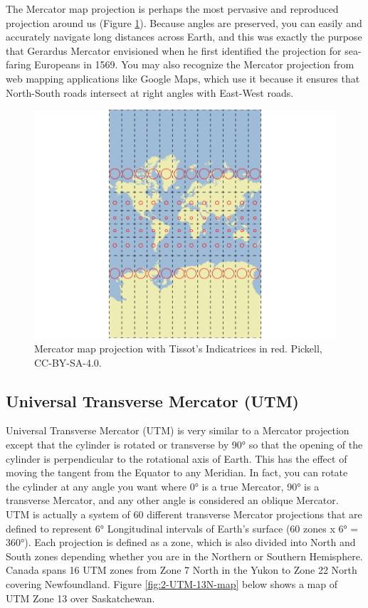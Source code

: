 \documentclass[
]{book}
\begin{document}
The Mercator map projection is perhaps the most pervasive and reproduced projection around us (Figure \ref{fig:2-Mercator-map}). Because angles are preserved, you can easily and accurately navigate long distances across Earth, and this was exactly the purpose that Gerardus Mercator envisioned when he first identified the projection for sea-faring Europeans in 1569. You may also recognize the Mercator projection from web mapping applications like Google Maps, which use it because it ensures that North-South roads intersect at right angles with East-West roads.

\begin{figure}
\includegraphics[width=0.75\linewidth]{images/02-Mercator-map} \caption{Mercator map projection with Tissot's Indicatrices in red. Pickell, CC-BY-SA-4.0.}\label{fig:2-Mercator-map}
\end{figure}

\hypertarget{universal-transverse-mercator-utm}{%
\subsection{Universal Transverse Mercator (UTM)}\label{universal-transverse-mercator-utm}}

Universal Transverse Mercator (UTM) is very similar to a Mercator projection except that the cylinder is rotated or transverse by 90° so that the opening of the cylinder is perpendicular to the rotational axis of Earth. This has the effect of moving the tangent from the Equator to any Meridian. In fact, you can rotate the cylinder at any angle you want where 0° is a true Mercator, 90° is a transverse Mercator, and any other angle is considered an oblique Mercator. UTM is actually a system of 60 different transverse Mercator projections that are defined to represent 6° Longitudinal intervals of Earth's surface (60 zones x 6° = 360°). Each projection is defined as a zone, which is also divided into North and South zones depending whether you are in the Northern or Southern Hemisphere. Canada spans 16 UTM zones from Zone 7 North in the Yukon to Zone 22 North covering Newfoundland. Figure \ref{fig:2-UTM-13N-map} below shows a map of UTM Zone 13 over Saskatchewan.
\end{document}
